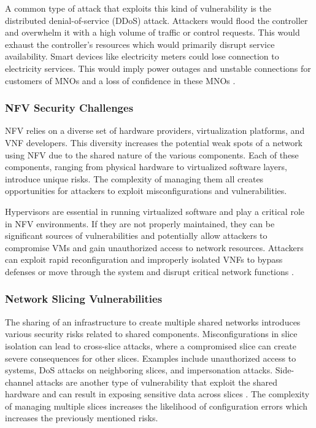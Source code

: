 \documentclass[acmtog]{acmart}
\begin{document}
A common type of attack that exploits this kind of vulnerability is the distributed denial-of-service (DDoS) attack. Attackers would flood the controller and overwhelm it with a high volume of traffic or control requests. This would exhaust the controller's resources which would primarily disrupt service availability. Smart devices like electricity meters could lose connection to electricity services. This would imply power outages and unstable connections for customers of MNOs and a loss of confidence in these MNOs \cite{ref3}.

\subsubsection{NFV Security Challenges}
NFV relies on a diverse set of hardware providers, virtualization platforms, and VNF developers. This diversity increases the potential weak spots of a network using NFV due to the shared nature of the various components. Each of these components, ranging from physical hardware to virtualized software layers, introduce unique risks. The complexity of managing them all creates opportunities for attackers to exploit misconfigurations and vulnerabilities. 

Hypervisors are essential in running virtualized software and play a critical role in NFV environments. If they are not properly maintained, they can be significant sources of vulnerabilities and potentially allow attackers to compromise VMs and gain unauthorized access to network resources. Attackers can exploit rapid reconfiguration and improperly isolated VNFs to bypass defenses or move through the system and disrupt critical network functions \cite{ref3_1}.

\subsubsection{Network Slicing Vulnerabilities}
The sharing of an infrastructure to create multiple shared networks introduces various security risks related to shared components. Misconfigurations in slice isolation can lead to cross-slice attacks, where a compromised slice can create severe consequences for other slices. Examples include unauthorized access to systems, DoS attacks on neighboring slices, and impersonation attacks. Side-channel attacks are another type of vulnerability that exploit the shared hardware and can result in exposing sensitive data across slices \cite{ref3_2}. The complexity of managing multiple slices increases the likelihood of configuration errors which increases the previously mentioned risks.
\end{document}
